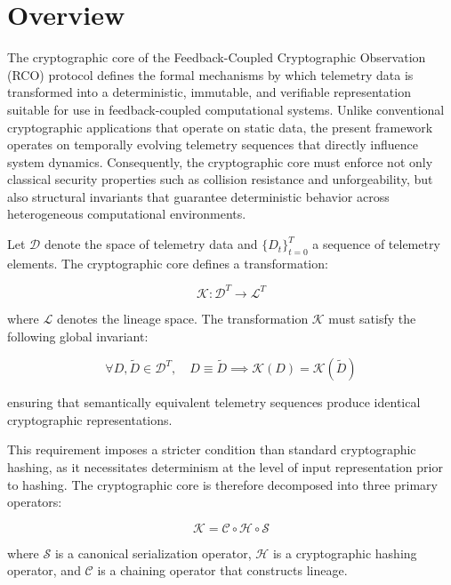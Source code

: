 \section{Overview}

The cryptographic core of the Feedback-Coupled Cryptographic Observation (RCO) protocol defines the formal mechanisms by which telemetry data is transformed into a deterministic, immutable, and verifiable representation suitable for use in feedback-coupled computational systems. Unlike conventional cryptographic applications that operate on static data, the present framework operates on temporally evolving telemetry sequences that directly influence system dynamics. Consequently, the cryptographic core must enforce not only classical security properties such as collision resistance and unforgeability, but also structural invariants that guarantee deterministic behavior across heterogeneous computational environments.

Let $\mathcal{D}$ denote the space of telemetry data and $\{D_t\}_{t=0}^{T}$ a sequence of telemetry elements. The cryptographic core defines a transformation:

\begin{equation}
\mathcal{K}: \mathcal{D}^{T} \rightarrow \mathcal{L}^{T}
\end{equation}

where $\mathcal{L}$ denotes the lineage space. The transformation $\mathcal{K}$ must satisfy the following global invariant:

\begin{equation}
\forall D, \tilde{D} \in \mathcal{D}^{T}, \quad D \equiv \tilde{D} \implies \mathcal{K}(D) = \mathcal{K}(\tilde{D})
\end{equation}

ensuring that semantically equivalent telemetry sequences produce identical cryptographic representations.

This requirement imposes a stricter condition than standard cryptographic hashing, as it necessitates determinism at the level of input representation prior to hashing. The cryptographic core is therefore decomposed into three primary operators:

\begin{equation}
\mathcal{K} = \mathcal{C} \circ \mathcal{H} \circ \mathcal{S}
\end{equation}

where $\mathcal{S}$ is a canonical serialization operator, $\mathcal{H}$ is a cryptographic hashing operator, and $\mathcal{C}$ is a chaining operator that constructs lineage.

